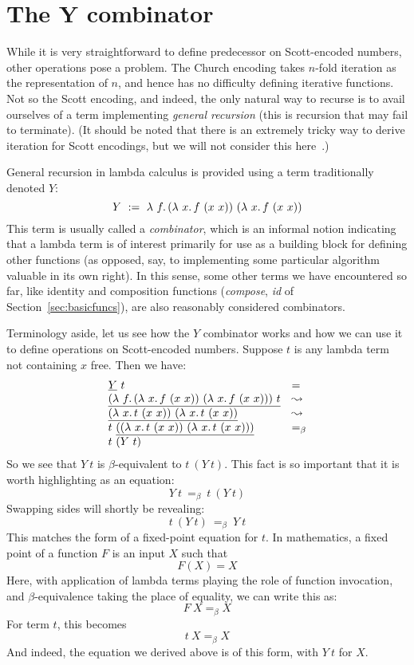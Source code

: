 \section{The Y combinator}
\label{sec:y}

While it is very straightforward to define predecessor on
Scott-encoded numbers, other operations pose a problem.  The Church
encoding takes $n$-fold iteration as the representation of $n$, and
hence has no difficulty defining iterative functions.  Not so the
Scott encoding, and indeed, the only natural way to recurse is to
avail ourselves of a term implementing \emph{general recursion} (this
is recursion that may fail to terminate).  (It should be noted that
there is an extremely tricky way to derive iteration for Scott encodings, but
we will not consider this here~\cite{lepigre+19}.)

General recursion in lambda calculus is provided using a term traditionally
denoted $Y$:
\[
Y \ :=\ \lam{f}{(\lam{x}{f\ (x\ x)})\ (\lam{x}{f\ (x\ x)})}
\]
\noindent This term is usually called a \emph{combinator}, which is an
informal notion indicating that a lambda term is of interest primarily
for use as a building block for defining other functions (as opposed,
say, to implementing some particular algorithm valuable in its own
right). In this sense, some other terms we have
encountered so far, like identity and composition functions
(\textit{compose}, \textit{id} of Section~\ref{sec:basicfuncs}), are
also reasonably considered combinators.

Terminology aside, let us see how the $Y$ combinator works and how we
can use it to define operations on Scott-encoded numbers.  Suppose $t$ is any
lambda term not containing $x$ free.  Then we have:
\[
\begin{array}{ll}
  \underline{Y}\ t & = \\
  \underline{(\lambda\ f.\, (\lambda\ x.\, f\ (x\ x))\ (\lambda\ x.\, f\ (x\ x)))\ t} & \leadsto \\
  \underline{(\lambda\ x.\, t\ (x\ x))\ (\lambda\ x.\, t\ (x\ x))} & \leadsto \\
  t\ \underline{((\lambda\ x.\, t\ (x\ x))\ (\lambda\ x.\, t\ (x\ x)))} & =_\beta \\
  t\ (Y\ t)
\end{array}
\]
\noindent So we see that $Y\ t$ is $\beta$-equivalent to $t\ (Y\ t)$.  This fact is so important that
it is worth highlighting as an equation:
\[
Y\ t\ =_\beta \ t\ (Y\ t)
\]
\noindent Swapping sides will shortly be revealing:
\[
t\ (Y\ t)\ =_\beta \ Y\ t
\]
\noindent This matches the form of a fixed-point equation for $t$.  In mathematics, a fixed point of a function $F$ is an input $X$ such that
\[
F(X) = X
\]
\noindent Here, with application of lambda terms playing the role of function invocation, and $\beta$-equivalence taking the place of equality,
we can write this as:
\[
F\ X =_\beta X
\]
\noindent For term $t$, this becomes
\[
t\ X =_\beta X
\]
\noindent And indeed, the equation we derived above is of this form, with $Y\ t$ for $X$.

